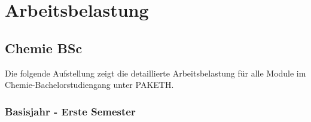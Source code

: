 \documentclass[a4paper]{article}
\begin{document}
\begin{comment}
\rowcolor{gray!20}
\multicolumn{5}{|l|}{\quad\textbf{Vertiefungsmodule (Wahlpflichtmodule – 15 KP)}} \\ \hline
\textit{Gemäß Wahl der Studierenden} & 2V+1U & variabel & - & 15 \\ \hline

\rowcolor{gray!20}
\multicolumn{5}{|l|}{\quad\textbf{Wissenschaft im Kontext (WIK) – Wahlpflichtmodule – 6 KP}} \\ \hline
\textit{Gemäß Vorgabe des D-CHAB} & 2V+1U & variabel & - & 6 \\ \hline

\rowcolor{gray!35}
\multicolumn{5}{|l|}{\textbf{c. Praxismodule – Pflichtmodule – 41 KP}} \\ \hline
\textit{Gemäß definierter Praktika} & 2V+1U & - & - & 41 \\ \hline
\end{longtable}
\end{comment}

\section{Arbeitsbelastung}

\subsection{Chemie BSc}

Die folgende Aufstellung zeigt die detaillierte Arbeitsbelastung für alle Module im Chemie-Bachelorstudiengang unter PAKETH.

\subsubsection{Basisjahr - Erste Semester}

\renewcommand{\arraystretch}{1.3}
\end{document}
